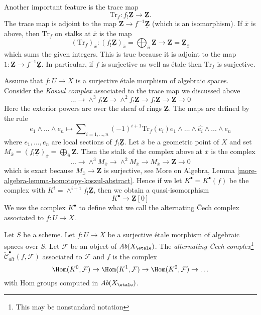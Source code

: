 \noindent
Another important feature is the trace map
$$
\text{Tr}_f : f_!\underline{\mathbf{Z}} \longrightarrow \underline{\mathbf{Z}}.
$$
The trace map is adjoint to the
map $\mathbf{Z} \to f^{-1}\underline{\mathbf{Z}}$ (which is an isomorphism).
If $\overline{x}$ is above, then $\text{Tr}_f$ on stalks at $\overline{x}$
is the map
$$
(\text{Tr}_f)_{\overline{x}} :
(f_!\underline{\mathbf{Z}})_{\overline{x}} =
\bigoplus\nolimits_{\overline{u}} \mathbf{Z}
\longrightarrow
\mathbf{Z} = \underline{\mathbf{Z}}_{\overline{x}}
$$
which sums the given integers. This is true because it is adjoint to the map
$1 : \mathbf{Z} \to f^{-1}\underline{\mathbf{Z}}$. In particular, if
$f$ is surjective as well as \'etale then $\text{Tr}_f$ is surjective.

\medskip\noindent
Assume that $f : U \to X$ is a surjective \'etale
morphism of algebraic spaces. Consider the {\it Koszul complex}
associated to the trace map we discussed above
$$
\ldots \to \wedge^3f_!\underline{\mathbf{Z}} \to
\wedge^2f_!\underline{\mathbf{Z}} \to f_!\underline{\mathbf{Z}} \to
\underline{\mathbf{Z}} \to 0
$$
Here the exterior powers are over the sheaf of rings $\underline{\mathbf{Z}}$.
The maps are defined by the rule
$$
e_1 \wedge \ldots \wedge e_n \longmapsto
\sum\nolimits_{i = 1, \ldots, n} (-1)^{i + 1}
\text{Tr}_f(e_i)
e_1 \wedge \ldots \wedge \widehat{e_i} \wedge \ldots \wedge e_n
$$
where $e_1, \ldots, e_n$ are local sections of $f_!\underline{\mathbf{Z}}$.
Let $\overline{x}$ be a geometric point of $X$ and set
$M_{\overline{x}} = (f_!\underline{\mathbf{Z}})_{\overline{x}} =
\bigoplus_{\overline{u}} \mathbf{Z}$. Then the stalk of the complex above at
$\overline{x}$ is the complex
$$
\ldots \to \wedge^3 M_{\overline{x}} \to \wedge^2 M_{\overline{x}}
\to M_{\overline{x}} \to \mathbf{Z} \to 0
$$
which is exact because $M_{\overline{x}} \to \mathbf{Z}$ is surjective, see
More on Algebra, Lemma \ref{more-algebra-lemma-homotopy-koszul-abstract}.
Hence if we let $K^\bullet = K^\bullet(f)$ be the complex with
$K^i = \wedge^{i + 1}f_!\underline{\mathbf{Z}}$, then we obtain a
quasi-isomorphism
\begin{equation}
\label{equation-quasi-isomorphism}
K^\bullet \longrightarrow \underline{\mathbf{Z}}[0]
\end{equation}
We use the complex $K^\bullet$ to define what we call
the alternating {\v C}ech complex associated to $f : U \to X$.

\begin{definition}
\label{definition-alternating-cech-complex}
Let $S$ be a scheme. Let $f : U \to X$ be a surjective \'etale morphism
of algebraic spaces over $S$. Let $\mathcal{F}$ be an object of
$\textit{Ab}(X_\etale)$. The
{\it alternating {\v C}ech complex}\footnote{This may be nonstandard notation}
$\check{\mathcal{C}}^\bullet_{alt}(f, \mathcal{F})$
associated to $\mathcal{F}$ and $f$ is the complex
$$
\Hom(K^0, \mathcal{F}) \to \Hom(K^1, \mathcal{F}) \to
\Hom(K^2, \mathcal{F}) \to \ldots
$$
with Hom groups computed in $\textit{Ab}(X_\etale)$.
\end{definition}

